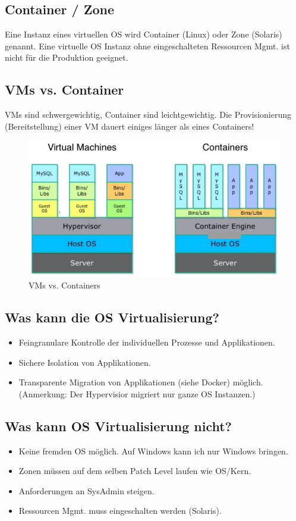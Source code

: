 \subsection{Container / Zone}
Eine Instanz eines virtuellen OS wird Container (Linux) oder Zone (Solaris) genannt. Eine virtuelle OS Instanz ohne eingeschalteten Ressourcen Mgmt. ist nicht für die Produktion geeignet.

\subsection{VMs vs. Container}
VMs sind schwergewichtig, Container sind leichtgewichtig. Die Provisionierung (Bereitstellung) einer VM dauert einiges länger als eines Containers!
\begin{figure}[h!]
\centering
\includegraphics[width=0.7\linewidth]{fig/vms-vs-containers}
\caption{VMs vs. Containers}
\label{fig:vms-vs-containers}
\end{figure}

\subsection{Was kann die OS Virtualisierung?}
\begin{itemize}
	\item Feingranulare Kontrolle der individuellen Prozesse und Applikationen.
	\item Sichere Isolation von Applikationen.
	\item Transparente Migration von Applikationen (siehe Docker) möglich. (Anmerkung: Der Hypervisior migriert nur ganze OS Instanzen.)
\end{itemize}

\subsection{Was kann OS Virtualisierung nicht?}
\begin{itemize}
	\item Keine fremden OS möglich. Auf Windows kann ich nur Windows bringen.
	\item Zonen müssen auf dem selben Patch Level laufen wie OS/Kern.
	\item Anforderungen an SysAdmin steigen.
	\item Ressourcen Mgmt. muss eingeschalten werden (Solaris).
\end{itemize}

